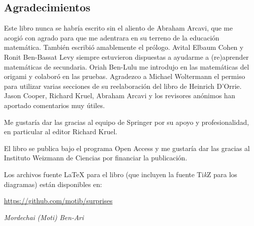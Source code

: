 \subsection*{Agradecimientos}

Este libro nunca se habría escrito sin el aliento de Abraham Arcavi, que me acogió con agrado para que me adentrara en su terreno de la educación matemática. También escribió amablemente el prólogo. Avital Elbaum Cohen y Ronit Ben-Bassat Levy siempre estuvieron dispuestas a ayudarme a (re)aprender matemáticas de secundaria. Oriah Ben-Lulu me introdujo en las matemáticas del origami y colaboró en las pruebas. Agradezco a Michael Woltermann el permiso para utilizar varias secciones de su reelaboración del libro de Heinrich D'Orrie. Jason Cooper, Richard Kruel, Abraham Arcavi y los revisores anónimos han aportado comentarios muy útiles.

Me gustaría dar las gracias al equipo de Springer por su apoyo y profesionalidad, en particular al editor Richard Kruel.

El libro se publica bajo el programa Open Access y me gustaría dar las gracias al Instituto Weizmann de Ciencias por financiar la publicación.

Los archivos fuente \LaTeX{} para el libro (que incluyen la fuente Ti\textit{k}Z para los diagramas) están disponibles en:
\begin{center}
\url{https://github.com/motib/surprises}
\end{center}

\medskip

\begin{flushright}
\textit{Mordechai (Moti) Ben-Ari}
\end{flushright}

\tableofcontents
